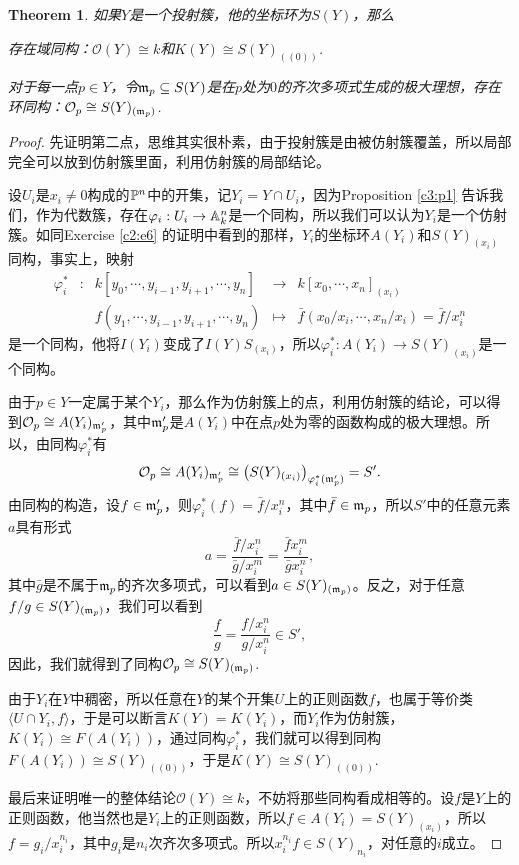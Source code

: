 \documentclass[9pt]{extbook}
\theoremstyle{plain}%
\newtheorem{theo}[defi]{Theorem}%
\begin{document}
\begin{theo}
	如果$Y$是一个投射簇，他的坐标环为$S(Y)$，那么

	 存在域同构：$\mathcal{O}(Y)\cong k$和$K(Y)\cong S(Y)_{((0))}$.

	 对于每一点$p\in Y$，令$\mathfrak{m}_p\subseteq S(Y)$是在$p$处为$0$的齐次多项式生成的极大理想，存在环同构：$\mathcal{O}_p\cong S(Y)_{(\mathfrak{m}_p)}$.
\end{theo}
\begin{proof}
	先证明第二点，思维其实很朴素，由于投射簇是由被仿射簇覆盖，所以局部完全可以放到仿射簇里面，利用仿射簇的局部结论。

	设$U_i$是$x_i\neq 0$构成的$\mathbb{P}^n$中的开集，记$Y_i=Y\cap U_i$，因为Proposition \ref{c3:p1} 告诉我们，作为代数簇，存在$\varphi_i:U_i\to \mathbb{A}^n_k$是一个同构，所以我们可以认为$Y_i$是一个仿射簇。如同Exercise \ref{c2:e6} 的证明中看到的那样，$Y_i$的坐标环$A(Y_i)$和$S(Y)_{(x_i)}$同构，事实上，映射
	\[
	\begin{array}{lcccl}
		\varphi^*_i&:&k[y_0,\cdots,y_{i-1},y_{i+1},\cdots,y_n]&\to& k[x_0,\cdots,x_n]_{(x_i)}\\
		&&f(y_1,\cdots,y_{i-1},y_{i+1},\cdots,y_n)&\mapsto &\bar{f}(x_0/x_i,\cdots,x_n/x_i)=\bar{f}/x_i^n
	\end{array}
	\]
	是一个同构，他将$I(Y_i)$变成了$I(Y)S_{(x_i)}$，所以$\varphi^*_i:A(Y_i)\to S(Y)_{(x_i)}$是一个同构。

	由于$p\in Y$一定属于某个$Y_i$，那么作为仿射簇上的点，利用仿射簇的结论，可以得到$\mathcal{O}_p\cong A(Y_i)_{\mathfrak{m}'_p}$，其中$\mathfrak{m}'_p$是$A(Y_i)$中在点$p$处为零的函数构成的极大理想。所以，由同构$\varphi^*_i$有
	\[
		\mathcal{O}_p\cong A(Y_i)_{\mathfrak{m}'_p}\cong \bigl(S(Y)_{(x_i)}\bigr)_{\varphi^*_i(\mathfrak{m}'_p)}=S'.
	\]
	由同构的构造，设$f\in \mathfrak{m}'_p$，则$\varphi^*_i(f)=\bar{f}/x_i^n$，其中$\bar{f}\in \mathfrak{m}_p$，所以$S'$中的任意元素$a$具有形式
	\[
		a=\frac{\bar{f}/x_i^n}{{\bar{g}/x_i^m}}=\frac{\bar{f} x_i^m}{\bar{g} x_i^n},
	\]
	其中$\bar{g}$是不属于$\mathfrak{m}_p$的齐次多项式，可以看到$a\in S(Y)_{(\mathfrak{m}_p)}$。反之，对于任意$f/g\in S(Y)_{(\mathfrak{m}_p)}$，我们可以看到
	\[
		\frac{f}{g}=\frac{f/x_i^n}{g/x_i^n}\in S',
	\]
	因此，我们就得到了同构$\mathcal{O}_p\cong S(Y)_{(\mathfrak{m}_p)}$.

	由于$Y_i$在$Y$中稠密，所以任意在$Y$的某个开集$U$上的正则函数$f$，也属于等价类$\langle U\cap Y_i,f\rangle$，于是可以断言$K(Y)=K(Y_i)$，而$Y_i$作为仿射簇，$K(Y_i)\cong F(A(Y_i))$，通过同构$\varphi^*_i$，我们就可以得到同构$F(A(Y_i))\cong S(Y)_{((0))}$，于是$K(Y) \cong S(Y)_{((0))}$.

	最后来证明唯一的整体结论$\mathcal{O}(Y)\cong k$，不妨将那些同构看成相等的。设$f$是$Y$上的正则函数，他当然也是$Y_i$上的正则函数，所以$f\in A(Y_i)= S(Y)_{(x_i)}$，所以$f=g_i/x_i^{n_i}$，其中$g_i$是$n_i$次齐次多项式。所以$x_i^{n_i}f\in S(Y)_{n_i}$，对任意的$i$成立。


\end{proof}
\end{document}
